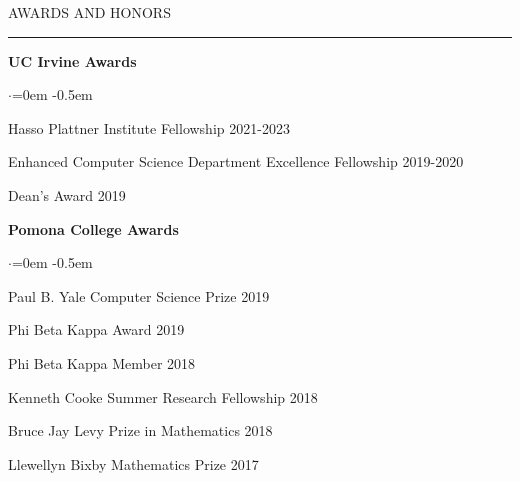 \documentclass{resume} %
\renewenvironment{rSection}[1]{
\sectionskip
\textcolor{CarnegieMellonRed}{\MakeUppercase{#1}}
\sectionlineskip
\hrule
\begin{list}{}{
\setlength{\leftmargin}{1.5em}
}
\item[]
}{
\end{list}
}
\begin{document}
\begin{rSection}{Awards and Honors}	
{\bf UC Irvine Awards}
\begin{list}{$\cdot$}{\leftmargin=0em} 
    \itemsep -0.5em \vspace{-0.5em}
\item Hasso Plattner Institute Fellowship\hfill { 2021-2023}
\item Enhanced Computer Science Department Excellence Fellowship\hfill { 2019-2020}
\item Dean's Award\hfill { 2019} 
\end{list} \vspace{0.5em}

{\bf Pomona College Awards}
\begin{list}{$\cdot$}{\leftmargin=0em} 
    \itemsep -0.5em \vspace{-0.5em}
\item Paul B. Yale Computer Science Prize \hfill { 2019}
\item Phi Beta Kappa Award \hfill { 2019}
\item Phi Beta Kappa Member  \hfill { 2018}
\item Kenneth Cooke Summer Research Fellowship \hfill { 2018}
\item Bruce Jay Levy Prize in Mathematics \hfill { 2018}
\item Llewellyn Bixby Mathematics Prize  \hfill { 2017}
\end{list}
\end{rSection}
\end{document}
